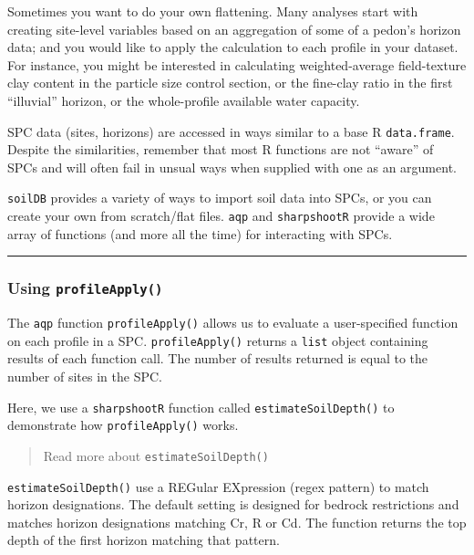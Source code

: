 \documentclass[]{article}
\begin{document}
Sometimes you want to do your own flattening. Many analyses start with
creating site-level variables based on an aggregation of some of a
pedon's horizon data; and you would like to apply the calculation to
each profile in your dataset. For instance, you might be interested in
calculating weighted-average field-texture clay content in the particle
size control section, or the fine-clay ratio in the first ``illuvial''
horizon, or the whole-profile available water capacity.

SPC data (sites, horizons) are accessed in ways similar to a base R
\texttt{data.frame}. Despite the similarities, remember that most R
functions are not ``aware'' of SPCs and will often fail in unsual ways
when supplied with one as an argument.

\texttt{soilDB} provides a variety of ways to import soil data into
SPCs, or you can create your own from scratch/flat files. \texttt{aqp}
and \texttt{sharpshootR} provide a wide array of functions (and more all
the time) for interacting with SPCs.

\begin{center}\rule{0.5\linewidth}{\linethickness}\end{center}

\subsubsection{\texorpdfstring{Using
\texttt{profileApply()}}{Using profileApply()}}\label{using-profileapply}

The \texttt{aqp} function \texttt{profileApply()} allows us to evaluate
a user-specified function on each profile in a SPC.
\texttt{profileApply()} returns a \texttt{list} object containing
results of each function call. The number of results returned is equal
to the number of sites in the SPC.

Here, we use a \texttt{sharpshootR} function called
\texttt{estimateSoilDepth()} to demonstrate how \texttt{profileApply()}
works.

\begin{quote}
Read more about \texttt{estimateSoilDepth()}
\end{quote}

\texttt{estimateSoilDepth()} use a REGular EXpression (regex pattern) to
match horizon designations. The default setting is designed for bedrock
restrictions and matches horizon designations matching Cr, R or Cd. The
function returns the top depth of the first horizon matching that
pattern.
\end{document}
